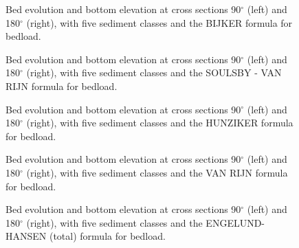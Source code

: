 \begin{figure} [!h]
\centering
{}
\caption{Bed evolution and bottom elevation at cross sections 90$^{\circ}$ (left) and 180$^{\circ}$ (right), with five sediment classes and the BIJKER formula for bedload.}\label{fig:results_multi4}
\end{figure}
\begin{figure} [!h]
\centering
{}
\caption{Bed evolution and bottom elevation at cross sections 90$^{\circ}$ (left) and 180$^{\circ}$ (right), with five sediment classes and the SOULSBY - VAN RIJN formula for bedload.}\label{fig:results_multi5}
\end{figure}
\begin{figure} [!h]
\centering
{}
\caption{Bed evolution and bottom elevation at cross sections 90$^{\circ}$ (left) and 180$^{\circ}$ (right), with five sediment classes and the HUNZIKER formula for bedload.}\label{fig:results_multi6}
\end{figure}
\begin{figure} [!h]
\centering
{}
\caption{Bed evolution and bottom elevation at cross sections 90$^{\circ}$ (left) and 180$^{\circ}$ (right), with five sediment classes and the VAN RIJN formula for bedload.}\label{fig:results_multi7}
\end{figure}
\begin{figure} [!h]
\centering
{}
\caption{Bed evolution and bottom elevation at cross sections 90$^{\circ}$ (left) and 180$^{\circ}$ (right), with five sediment classes and the ENGELUND-HANSEN (total) formula for bedload.}\label{fig:results_multi30}
\end{figure}

